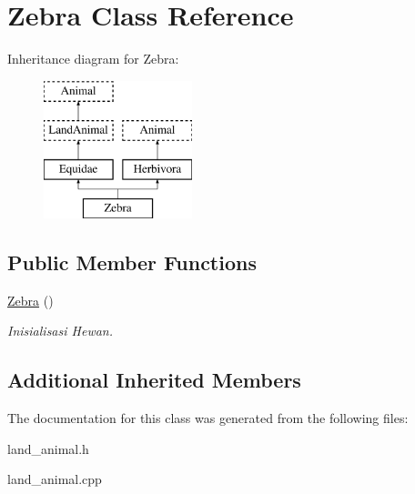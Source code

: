 \hypertarget{class_zebra}{}\section{Zebra Class Reference}
\label{class_zebra}
Inheritance diagram for Zebra\+:\begin{figure}[H]
\begin{center}
\leavevmode
\includegraphics[height=4.000000cm]{class_zebra}
\end{center}
\end{figure}
\subsection*{Public Member Functions}
\begin{DoxyCompactItemize}
\item 
\hyperlink{class_zebra_a06481320d8c665bb5f39e85f83c14ca5}{Zebra} ()\hypertarget{class_zebra_a06481320d8c665bb5f39e85f83c14ca5}{}\label{class_zebra_a06481320d8c665bb5f39e85f83c14ca5}

\begin{DoxyCompactList}\small\item\em Inisialisasi Hewan. \end{DoxyCompactList}\end{DoxyCompactItemize}
\subsection*{Additional Inherited Members}


The documentation for this class was generated from the following files\+:\begin{DoxyCompactItemize}
\item 
land\+\_\+animal.\+h\item 
land\+\_\+animal.\+cpp\end{DoxyCompactItemize}
